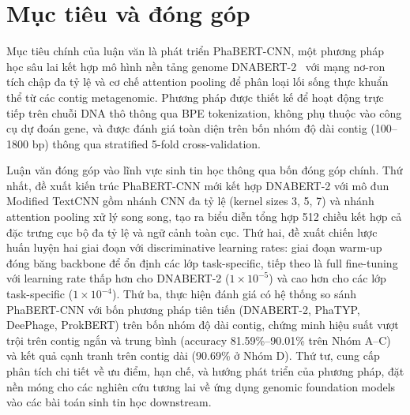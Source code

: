 \section{Mục tiêu và đóng góp}
\label{sec:objectives}

Mục tiêu chính của luận văn là phát triển PhaBERT-CNN, một phương pháp học sâu lai kết hợp mô hình nền tảng genome DNABERT-2~\cite{zhou2023dnabert} với mạng nơ-ron tích chập đa tỷ lệ và cơ chế attention pooling để phân loại lối sống thực khuẩn thể từ các contig metagenomic. Phương pháp được thiết kế để hoạt động trực tiếp trên chuỗi DNA thô thông qua BPE tokenization, không phụ thuộc vào công cụ dự đoán gene, và được đánh giá toàn diện trên bốn nhóm độ dài contig (100--1800 bp) thông qua stratified 5-fold cross-validation.

Luận văn đóng góp vào lĩnh vực sinh tin học thông qua bốn đóng góp chính. Thứ nhất, đề xuất kiến trúc PhaBERT-CNN mới kết hợp DNABERT-2 với mô đun Modified TextCNN gồm nhánh CNN đa tỷ lệ (kernel sizes 3, 5, 7) và nhánh attention pooling xử lý song song, tạo ra biểu diễn tổng hợp 512 chiều kết hợp cả đặc trưng cục bộ đa tỷ lệ và ngữ cảnh toàn cục. Thứ hai, đề xuất chiến lược huấn luyện hai giai đoạn với discriminative learning rates: giai đoạn warm-up đóng băng backbone để ổn định các lớp task-specific, tiếp theo là full fine-tuning với learning rate thấp hơn cho DNABERT-2 ($1 \times 10^{-5}$) và cao hơn cho các lớp task-specific ($1 \times 10^{-4}$). Thứ ba, thực hiện đánh giá có hệ thống so sánh PhaBERT-CNN với bốn phương pháp tiên tiến (DNABERT-2, PhaTYP, DeePhage, ProkBERT) trên bốn nhóm độ dài contig, chứng minh hiệu suất vượt trội trên contig ngắn và trung bình (accuracy 81.59\%--90.01\% trên Nhóm A--C) và kết quả cạnh tranh trên contig dài (90.69\% ở Nhóm D). Thứ tư, cung cấp phân tích chi tiết về ưu điểm, hạn chế, và hướng phát triển của phương pháp, đặt nền móng cho các nghiên cứu tương lai về ứng dụng genomic foundation models vào các bài toán sinh tin học downstream.
